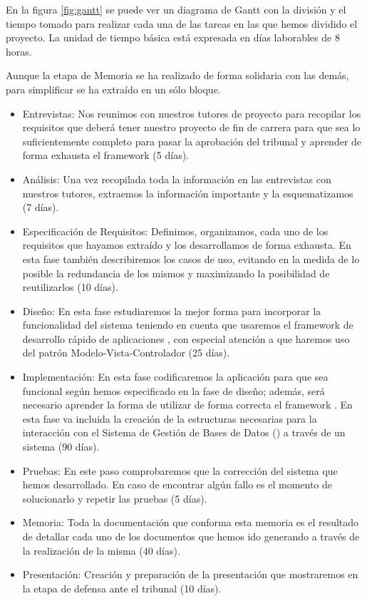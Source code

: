 En la figura \ref{fig:gantt} se puede ver un diagrama de Gantt con la división y el tiempo
tomado para realizar cada una de las tareas en las que hemos dividido el
proyecto. La unidad de tiempo básica está expresada en días laborables de 8
horas.

Aunque la etapa de Memoria se ha realizado de forma solidaria con las demás,
para simplificar se ha extraído en un sólo bloque.

\begin{itemize}
\item Entrevistas: Nos reunimos con nuestros tutores de proyecto para recopilar
  los requisitos que deberá tener nuestro proyecto de fin de carrera para que
  sea lo suficientemente completo para pasar la aprobación del tribunal y
  aprender de forma exhausta el framework  (5 días).
\item Análisis: Una vez recopilada toda la información en las entrevistas con
  nuestros tutores, extraemos la información importante y la esquematizamos (7
  días).
\item Especificación de Requisitos: Definimos, organizamos, cada uno de los
  requisitos que hayamos extraído y los desarrollamos de forma exhausta. En esta
  fase también describiremos los casos de uso, evitando en la medida de lo
  posible la redundancia de los mismos y maximizando la posibilidad de
  reutilizarlos (10 días).
\item Diseño: En esta fase estudiaremos la mejor forma para incorporar la
  funcionalidad del sistema teniendo en cuenta que usaremos el framework de
  desarrollo rápido de aplicaciones , con especial
  atención a que haremos uso del patrón Modelo-Vista-Controlador (25 días).
\item Implementación: En esta fase codificaremos la aplicación para que sea
  funcional según hemos especificado en la fase de diseño; además, será
  necesario aprender la forma de utilizar de forma correcta el framework
  . En esta fase va incluida la creación de la
  estructuras necesarias para la interacción con el Sistema de Gestión de Bases
  de Datos () a través de un sistema  (90 días).
\item Pruebas: En este paso comprobaremos que la corrección del sistema que
  hemos desarrollado. En caso de encontrar algún fallo es el momento de
  solucionarlo y repetir las pruebas (5 días).
\item Memoria: Toda la documentación que conforma esta memoria es el resultado
  de detallar cada uno de los documentos que hemos ido generando a través de la
  realización de la misma (40 días).
\item Presentación: Creación y preparación de la presentación que mostraremos en
  la etapa de defensa ante el tribunal (10 días).
\end{itemize}

